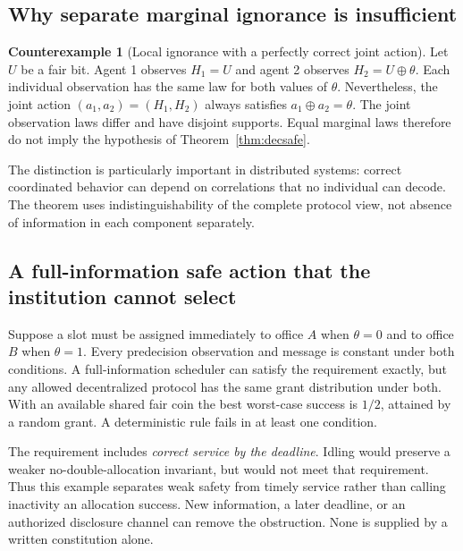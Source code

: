 \documentclass[11pt,letterpaper]{article}
\theoremstyle{plain}
\theoremstyle{definition}
\newtheorem{counterexample}[proposition]{Counterexample}
\theoremstyle{remark}
\begin{document}
\subsection{Why separate marginal ignorance is insufficient}
\begin{counterexample}[Local ignorance with a perfectly correct joint action]\label{ex:jointviews}
Let $U$ be a fair bit. Agent 1 observes $H_1=U$ and agent 2 observes $H_2=U\oplus\theta$. Each individual observation has the same law for both values of $\theta$. Nevertheless, the joint action $(a_1,a_2)=(H_1,H_2)$ always satisfies $a_1\oplus a_2=\theta$. The joint observation laws differ and have disjoint supports. Equal marginal laws therefore do not imply the hypothesis of Theorem~\ref{thm:decsafe}.
\end{counterexample}

The distinction is particularly important in distributed systems: correct coordinated behavior can depend on correlations that no individual can decode. The theorem uses indistinguishability of the complete protocol view, not absence of information in each component separately.

\subsection{A full-information safe action that the institution cannot select}
Suppose a slot must be assigned immediately to office $A$ when $\theta=0$ and to office $B$ when $\theta=1$. Every predecision observation and message is constant under both conditions. A full-information scheduler can satisfy the requirement exactly, but any allowed decentralized protocol has the same grant distribution under both. With an available shared fair coin the best worst-case success is $1/2$, attained by a random grant. A deterministic rule fails in at least one condition.

The requirement includes \emph{correct service by the deadline}. Idling would preserve a weaker no-double-allocation invariant, but would not meet that requirement. Thus this example separates weak safety from timely service rather than calling inactivity an allocation success. New information, a later deadline, or an authorized disclosure channel can remove the obstruction. None is supplied by a written constitution alone.
\end{document}
